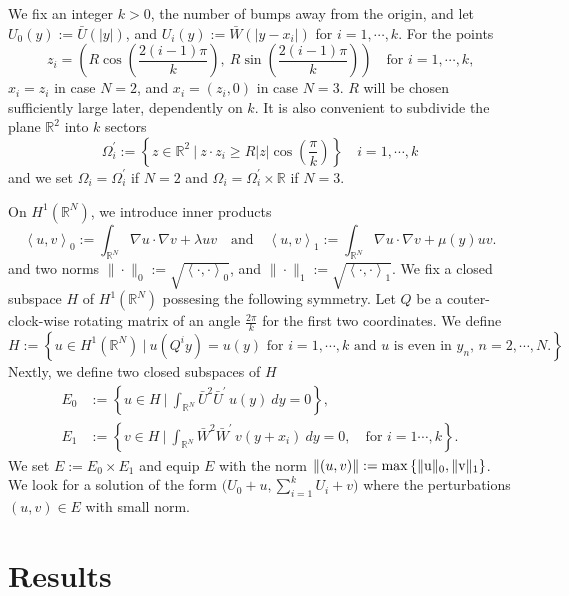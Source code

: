 \documentclass[a4paper,11pt]{article}
\theoremstyle{remark}
\begin{document}
We fix an integer $k>0$, the number of bumps away from the origin, and let $U_0(y):=\bar{U}(|y|)$, and $U_i(y):=\bar{W}(|y-x_i|)$ for $i=1,\cdots,k$. For the points 
$$z_i= \left( R \cos\left(\frac{2(i-1)\pi}{k}\right), ~R \sin\left(\frac{2(i-1)\pi}{k}\right)\right) \quad \text{for $i=1,\cdots,k$,}$$
$x_i = z_i$ in case $N=2$, and $x_i = (z_i,0)$ in case $N=3$. $R$ will be chosen sufficiently large later, dependently on $k$. It is also convenient to subdivide the plane $\mathbb{R}^2$ into $k$ sectors
$$\Omega^\prime_i := \left\{z \in \mathbb{R}^2~\Big|~ z\cdot z_i \ge R|z|\cos\left(\frac{\pi}{k}\right)\right\} \quad i=1,\cdots,k$$
and we set $\Omega_i = \Omega^\prime_i$ if $N=2$ and $\Omega_i = \Omega^\prime_i \times \mathbb{R}$ if $N=3$.




On $H^1( \mathbb{R}^N)$, we introduce inner products
$$ \left<u,v\right>_0:= \int_{ \mathbb{R}^N} \nabla u\cdot\nabla v + \lambda uv \quad \text{and} \quad \left<u,v\right>_1:= \int_{ \mathbb{R}^N} \nabla u\cdot\nabla v + \mu(y) uv.$$ and two norms $\|\cdot\|_0:=\sqrt{\left<\cdot,\cdot\right>_0}$, and $\|\cdot\|_1:=\sqrt{\left<\cdot,\cdot\right>_1}$. We fix a closed subspace $H$ of $H^1( \mathbb{R}^N)$ possesing the following symmetry. Let $Q$ be a couter-clock-wise rotating matrix of an angle $\frac{2\pi}{k}$ for the first two coordinates. We define 
\begin{equation*}
 H:= \left\{ u \in H^1 (\mathbb{R}^N) ~\Big|~ \text{$u(Q^iy) = u(y)$ for $i=1,\cdots,k$ and $u$ is even in $y_n$, $n=2,\cdots,N$.}\right\}
\end{equation*}
Nextly, we define two closed subspaces of $H$
\begin{equation}
 \begin{aligned}
 E_0&:= \left\{ u \in H ~\Big|~ \int_{\mathbb{R}^N}   \bar{U}^2 \bar{U}^\prime \,u(y)~dy = 0 \right\}, \\
 E_1&:= \left\{ v \in H ~\Big|~ \int_{\mathbb{R}^N}   \bar{W}^2 \bar{W}^\prime \,v(y+x_i)~dy = 0, \quad \text{for $i=1\cdots,k$} \right\}.
 \end{aligned}
\end{equation}
We set $E:= E_0 \times E_1$ and equip $E$ with the norm $\|(u,v)\|:= \rm{max} \left\{ \|u\|_0, \|v\|_1\right\}$. We look for a solution of the form $\Big(U_0 +u, \displaystyle \sum_{i=1}^k U_i + v\Big)$ where the perturbations $(u,v)\in E$ with small norm. 




\section{Results} \label{sec:result}
\end{document}
